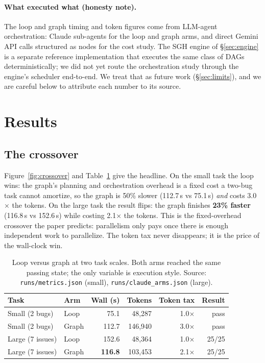 \documentclass[11pt]{article}
\begin{document}
\paragraph{What executed what (honesty note).} The loop and graph timing and token figures come
from LLM-agent orchestration: Claude sub-agents for the loop and graph arms, and direct Gemini API
calls structured as nodes for the cost study. The SGH engine of \S\ref{sec:engine} is a separate
reference implementation that executes the same class of DAGs deterministically; we did not yet
route the orchestration study through the engine's scheduler end-to-end. We treat that as future
work (\S\ref{sec:limits}), and we are careful below to attribute each number to its source.

\section{Results}
\label{sec:results}

\subsection{The crossover}
Figure~\ref{fig:crossover} and Table~\ref{tab:cross} give the headline. On the small task the loop
wins: the graph's planning and orchestration overhead is a fixed cost a two-bug task cannot
amortize, so the graph is 50\% slower (112.7\,s vs 75.1\,s) \emph{and} costs 3.0$\times$ the tokens.
On the large task the result flips: the graph finishes \textbf{23\% faster} (116.8\,s vs 152.6\,s)
while costing 2.1$\times$ the tokens. This is the fixed-overhead crossover the paper predicts:
parallelism only pays once there is enough independent work to parallelize. The token tax never
disappears; it is the price of the wall-clock win.

\begin{table}[h]
\centering
\small
\caption{Loop versus graph at two task scales. Both arms reached the same passing state; the only
variable is execution style. Source: \texttt{runs/metrics.json} (small),
\texttt{runs/claude\_arms.json} (large).}
\label{tab:cross}
\begin{tabular}{@{}llrrrr@{}}
\toprule
\textbf{Task} & \textbf{Arm} & \textbf{Wall (s)} & \textbf{Tokens} & \textbf{Token tax} & \textbf{Result}\\
\midrule
Small (2 bugs)  & Loop  & 75.1  & 48{,}287  & 1.0$\times$ & pass\\
Small (2 bugs)  & Graph & 112.7 & 146{,}940 & 3.0$\times$ & pass\\
Large (7 issues)& Loop  & 152.6 & 48{,}364  & 1.0$\times$ & 25/25\\
Large (7 issues)& Graph & \textbf{116.8} & 103{,}453 & 2.1$\times$ & 25/25\\
\bottomrule
\end{tabular}
\end{table}
\end{document}
